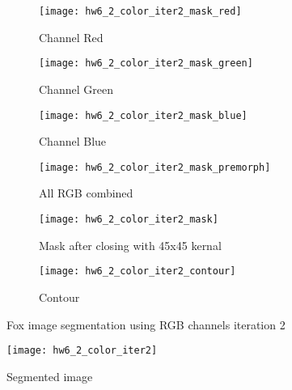 \documentclass[11pt]{article}
\begin{document}
\begin{figure}[H]
\begin{subfigure}{.5\textwidth}
  \centering
  \texttt{[image: hw6\_2\_color\_iter2\_mask\_red]}
  \caption{Channel Red}
  \label{}
\end{subfigure}
\begin{subfigure}{.5\textwidth}
  \centering
  \texttt{[image: hw6\_2\_color\_iter2\_mask\_green]}
  \caption{Channel Green}
  \label{}
\end{subfigure}

\begin{subfigure}{.5\textwidth}
  \centering
  \texttt{[image: hw6\_2\_color\_iter2\_mask\_blue]}
  \caption{Channel Blue}
  \label{}
\end{subfigure}
\begin{subfigure}{.5\textwidth}
  \centering
  \texttt{[image: hw6\_2\_color\_iter2\_mask\_premorph]}
  \caption{All RGB combined}
  \label{}
\end{subfigure}

\begin{subfigure}{.5\textwidth}
  \centering
  \texttt{[image: hw6\_2\_color\_iter2\_mask]}
  \caption{Mask after closing with 45x45 kernal}
  \label{}
\end{subfigure}
\begin{subfigure}{.5\textwidth}
  \centering
  \texttt{[image: hw6\_2\_color\_iter2\_contour]}
  \caption{Contour}
  \label{}
\end{subfigure}

\caption{Fox image segmentation using RGB channels iteration 2}
\label{}
\end{figure}

\begin{figure}[H]
\centering
\texttt{[image: hw6\_2\_color\_iter2]}
\caption{Segmented image}
\label{}
\end{figure}
\end{document}

